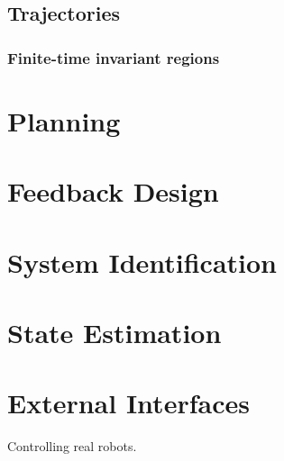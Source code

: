 \documentclass{book}
\begin{document}
\section{Trajectories}

\subsection{Finite-time invariant regions}


\chapter{Planning}

\chapter{Feedback Design}

\chapter{System Identification}

\chapter{State Estimation}

\chapter{External Interfaces}

Controlling real robots. 

\appendix






\end{document}
